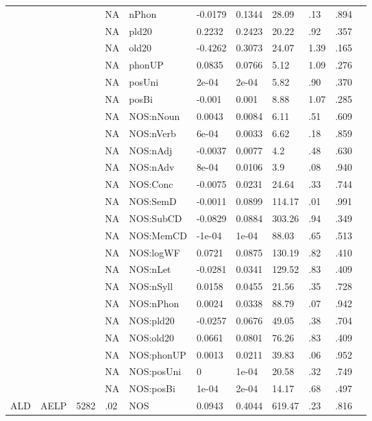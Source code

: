 \begin{table}[ht]
\begin{tabular}{lllllllllll}
   &  &  & NA & nPhon & -0.0179 & 0.1344 & 28.09 & .13 & .894 &   \\ 
   &  &  & NA & pld20 & 0.2232 & 0.2423 & 20.22 & .92 & .357 &   \\ 
   &  &  & NA & old20 & -0.4262 & 0.3073 & 24.07 & 1.39 & .165 &   \\ 
   &  &  & NA & phonUP & 0.0835 & 0.0766 & 5.12 & 1.09 & .276 &   \\ 
   &  &  & NA & posUni & 2e-04 & 2e-04 & 5.82 & .90 & .370 &   \\ 
   &  &  & NA & posBi & -0.001 & 0.001 & 8.88 & 1.07 & .285 &   \\ 
   &  &  & NA & NOS:nNoun & 0.0043 & 0.0084 & 6.11 & .51 & .609 &   \\ 
   &  &  & NA & NOS:nVerb & 6e-04 & 0.0033 & 6.62 & .18 & .859 &   \\ 
   &  &  & NA & NOS:nAdj & -0.0037 & 0.0077 & 4.2 & .48 & .630 &   \\ 
   &  &  & NA & NOS:nAdv & 8e-04 & 0.0106 & 3.9 & .08 & .940 &   \\ 
   &  &  & NA & NOS:Conc & -0.0075 & 0.0231 & 24.64 & .33 & .744 &   \\ 
   &  &  & NA & NOS:SemD & -0.0011 & 0.0899 & 114.17 & .01 & .991 &   \\ 
   &  &  & NA & NOS:SubCD & -0.0829 & 0.0884 & 303.26 & .94 & .349 &   \\ 
   &  &  & NA & NOS:MemCD & -1e-04 & 1e-04 & 88.03 & .65 & .513 &   \\ 
   &  &  & NA & NOS:logWF & 0.0721 & 0.0875 & 130.19 & .82 & .410 &   \\ 
   &  &  & NA & NOS:nLet & -0.0281 & 0.0341 & 129.52 & .83 & .409 &   \\ 
   &  &  & NA & NOS:nSyll & 0.0158 & 0.0455 & 21.56 & .35 & .728 &   \\ 
   &  &  & NA & NOS:nPhon & 0.0024 & 0.0338 & 88.79 & .07 & .942 &   \\ 
   &  &  & NA & NOS:pld20 & -0.0257 & 0.0676 & 49.05 & .38 & .704 &   \\ 
   &  &  & NA & NOS:old20 & 0.0661 & 0.0801 & 76.26 & .83 & .409 &   \\ 
   &  &  & NA & NOS:phonUP & 0.0013 & 0.0211 & 39.83 & .06 & .952 &   \\ 
   &  &  & NA & NOS:posUni & 0 & 1e-04 & 20.58 & .32 & .749 &   \\ 
   &  &  & NA & NOS:posBi & 1e-04 & 2e-04 & 14.17 & .68 & .497 &   \\ 
  ALD & AELP & 5282 & .02 & NOS & 0.0943 & 0.4044 & 619.47 & .23 & .816 &   \\ 

\end{tabular}
\end{table}
